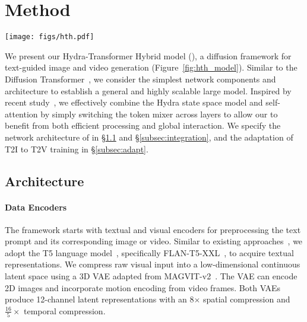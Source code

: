 \section{Method}
\label{sec:method}

\begin{figure*}[t]
  \centering
  \texttt{[image: figs/hth.pdf]}
  \vspace{-5pt}
  \caption{Illustration of our diffusion Hybrid Hydra (\ours{}) model for image and video generation. The architecture consists of $N$ stacked blocks, each comprising a cross-attention layer, a token mixer, and a feed-forward network. (a) The token mixer can be implemented as either the Hydra state space model or self-attention. (b) For image data, we use horizontal and vertical bidirectional raster scans on tokens, and for video data, an additional bidirectional temporal scan is applied.}
  \label{fig:hth_model}
  \vspace{-7pt}
\end{figure*}


We present our Hydra-Transformer Hybrid model (\ours{}), a diffusion framework for text-guided image and video generation (Figure~\ref{fig:hth_model}). Similar to the Diffusion Transformer~\citep{peebles2023dit}, we consider the simplest network components and architecture to establish a general and highly scalable large model. Inspired by recent study~\citep{waleffe2024empirical}, we effectively combine the Hydra state space model and self-attention by simply switching the token mixer across layers to allow our \ours{} to benefit from both efficient processing and global interaction. We specify the network architecture of \ours{} in \S\ref{subsec:hth} and \S\ref{subsec:integration}, and the adaptation of T2I to T2V training in \S\ref{subsec:adapt}.

\subsection{\ours{} Architecture}
\label{subsec:hth}

\paragraph{Data Encoders} 
The framework starts with textual and visual encoders for preprocessing the text prompt and its corresponding image or video. Similar to existing approaches~\citep{ho2022imagenvideo,kondratyuk2023videopoet,sun2024autoregressive,FLUX2024}, we adopt the T5 language model~\citep{raffel2020exploringt5}, specifically FLAN-T5-XXL~\citep{chung2024scalingt5}, to acquire textual representations. We compress raw visual input into a low-dimensional continuous latent space using a 3D VAE adapted from MAGVIT-v2~\citep{yu2023magvitv2}. The VAE can encode 2D images and incorporate motion encoding from video frames. Both VAEs produce 12-channel latent representations with an 8$\times$ spatial compression and $\frac{16}{5}\times$ temporal compression.


